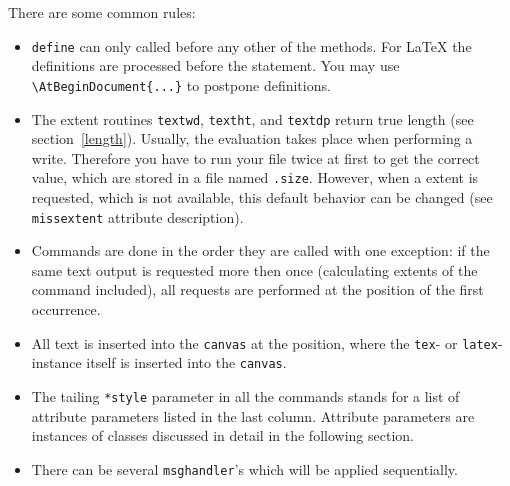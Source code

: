 There are some common rules:
\begin{itemize}
\item \verb|define| can only called before any other of the methods. For
\LaTeX{} the definitions are processed before the \verb||
statement. You may use \verb|\AtBeginDocument{...}| to postpone definitions.
\item The extent routines \verb|textwd|, \verb|textht|, and
\verb|textdp| return true \PyX{} length (see section~\ref{length}).
Usually, the evaluation takes place when performing a write. Therefore
you have to run your file twice at first to get the correct value,
which are stored in a file named \verb|.size|. However, when a extent
is requested, which is not available, this default behavior can be
changed (see \verb|missextent| attribute description).
\item Commands are done in the order they are called with one exception:
if the same text output is requested more then once (calculating extents
of the command included), all requests are performed at the position of
the first occurrence.
\item All text is inserted into the \verb|canvas| at the position, where
the \verb|tex|- or \verb|latex|-instance itself is inserted into the
\verb|canvas|.
\item The tailing \verb|*style| parameter in all the commands stands
for a list of attribute parameters listed in the last column.
Attribute parameters are instances of classes discussed in detail in
the following section.
\item There can be several \verb|msghandler|'s which will be applied
sequentially.
\end{itemize}


